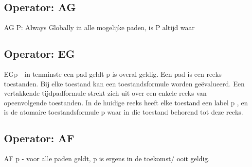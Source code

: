 \documentclass{article}
\begin{document}
	\subsection{Operator: AG}
	
	
	AG P: Always Globally in alle mogelijke paden, is P altijd waar
	
	
	
	\subsection{Operator: EG}
	EGp - in tenminste een pad geldt p is overal geldig.
	Een pad is een reeks toestanden. Bij elke toestand kan een toestandsformule worden geëvalueerd. Een vertakkende tijdpadformule strekt zich uit over een enkele reeks van opeenvolgende toestanden.
	In de huidige reeks heeft elke toestand een label p , en  is de atomaire toestandsformule p waar in die toestand behorend tot deze reeks.
	
	
	\subsection{Operator: AF}
	AF p - voor alle paden geldt, p is ergens in de toekomst/ ooit geldig.
	
\end{document}
